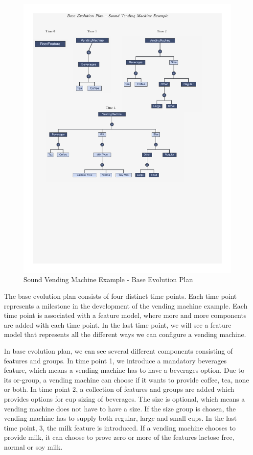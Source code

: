 \documentclass[a4paper,english]{ifimaster}
\begin{document}
\begin{figure}[htpb]
  \centering
  \includegraphics[width=\linewidth]{vending_machine/base_plan.pdf}
  \caption{Sound Vending Machine Example - Base Evolution Plan}%
  \label{fig:vending_machine_sound_base_ep}
\end{figure}

The base evolution plan consists of four distinct time points. Each time point represents a milestone in the development of the vending machine example. Each time point is associated with a feature model, where more and more components are added with each time point. In the last time point, we will see a feature model that represents all the different ways we can configure a vending machine.

In base evolution plan, we can see several different components consisting of features and groups. In time point 1, we introduce a mandatory beverages feature, which means a vending machine has to have a beverages option. Due to its or-group, a vending machine can choose if it wants to provide coffee, tea, none or both. In time point 2, a collection of features and groups are added which provides options for cup sizing of beverages. The size is optional, which means a vending machine does not have to have a size. If the size group is chosen, the vending machine has to supply both regular, large and small cups. In the last time point, 3, the milk feature is introduced. If a vending machine chooses to provide milk, it can choose to prove zero or more of the features lactose free, normal or soy milk.
\end{document}
